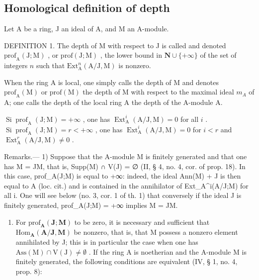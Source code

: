 \subsection{Homological definition of depth}

Let A be a ring, J an ideal of A, and M an A-module.

DEFINITION 1. The depth of M with respect to J is called and denoted \(\mathrm{prof}_{\mathrm{A}}(\mathrm{J};\mathrm{M})\) , or \(\mathrm{prof}(\mathrm{J};\mathrm{M})\) , the lower bound in \(\mathbf{N}\cup\{+\infty\}\) of the set of integers \(n\) such that \(\mathrm{Ext}_{\mathrm{A}}^{n}(\mathrm{A}/\mathrm{J},\mathrm{M})\) is nonzero.

When the ring A is local, one simply calls the depth of M and denotes \(\text{prof}_{\mathrm{A}}(\mathrm{M})\) or \(\text{prof}(\mathrm{M})\) the depth of M with respect to the maximal ideal \(m_{A}\) of A; one calls the depth of the local ring A the depth of the A-module A.

\(\operatorname{Si} \operatorname{prof}_{\mathrm{A}}(\mathrm{J}; \mathrm{M}) = +\infty\) , one has \(\operatorname{Ext}_{\mathrm{A}}^{i}(\mathrm{A}/\mathrm{J}, \mathrm{M}) = 0\) for all \(i\) . \(\operatorname{Si} \operatorname{prof}_{\mathrm{A}}(\mathrm{J}; \mathrm{M}) = r < +\infty\) , one has \(\operatorname{Ext}_{\mathrm{A}}^{i}(\mathrm{A}/\mathrm{J}, \mathrm{M}) = 0\) for \(i < r\) and \(\operatorname{Ext}_{\mathrm{A}}^{r}(\mathrm{A}/\mathrm{J}, \mathrm{M}) \neq 0\) .

Remarks.--- 1) Suppose that the A-module M is finitely generated and that one has M = JM, that is, Supp(M) ∩ V(J) = ∅ (II, § 4, no. 4, cor. of prop. 18). In this case, prof\_A(J;M) is equal to +∞: indeed, the ideal Ann(M) + J is then equal to A (loc. cit.) and is contained in the annihilator of Ext\_A\^{}i(A/J;M) for all i. One will see below (no. 3, cor. 1 of th. 1) that conversely if the ideal J is finitely generated, prof\_A(J;M) = +∞ implies M = JM.

\begin{enumerate}
\def\labelenumi{\arabic{enumi})}
\setcounter{enumi}{1}
\tightlist
\item
  For \(\mathrm{prof}_{\mathbf{A}}(\mathbf{J};\mathbf{M})\) to be zero, it is necessary and sufficient that \(\mathrm{Hom}_{\mathbf{A}}(\mathbf{A} / \mathbf{J},\mathbf{M})\) be nonzero, that is, that M possess a nonzero element annihilated by J; this is in particular the case when one has \(\mathrm{Ass(M)}\cap \mathrm{V(J)}\neq \emptyset\) . If the ring A is noetherian and the A-module M is finitely generated, the following conditions are equivalent (IV, § 1, no. 4, prop. 8):
\end{enumerate}

